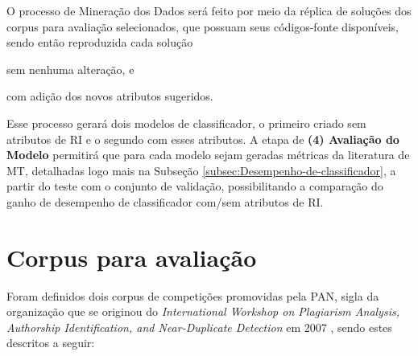     O processo de Mineração dos Dados será feito por meio da réplica de soluções dos corpus para avaliação selecionados, que possuam seus códigos-fonte disponíveis, sendo então reproduzida cada solução 
    \begin{enumerate*}[label=(\alph*)]
        \item sem nenhuma alteração, e 
        \item com adição dos novos atributos sugeridos.
    \end{enumerate*}
    Esse processo gerará dois modelos de classificador, o primeiro criado sem atributos de RI e o segundo com esses atributos.
    A etapa de \textbf{(4) Avaliação do Modelo} permitirá que para cada modelo sejam geradas métricas da literatura de MT, detalhadas logo mais na Subseção \ref{subsec:Desempenho-de-classificador}, a partir do teste com o conjunto de validação, possibilitando a comparação do ganho de desempenho de classificador com/sem atributos de RI.
    
    
    

\section{Corpus para avaliação}  \label{sec:Corpus-para-avaliação}
    Foram definidos dois corpus de competições promovidas pela PAN, sigla da organização que se originou do \textit{International Workshop on Plagiarism Analysis, Authorship Identification, and Near-Duplicate Detection} em 2007 \cite{PAN_Workshop_2007}, sendo estes descritos a seguir:%
    
